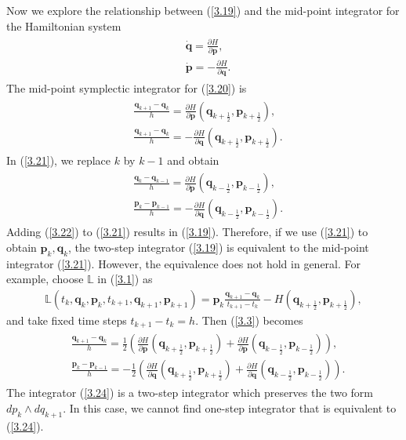 \documentclass[a4paper,a4paper]{article}
\def\q{\boldsymbol{q}}
\def\p{\boldsymbol{p}}
\begin{document}
Now we explore the relationship between (\ref{3.19}) and the mid-point integrator
for the Hamiltonian system
\begin{align}
\begin{split}
     &\dot{\q}=\frac{\partial H}{\partial \p},\\
     &\dot{\p}=-\frac{\partial H}{\partial \q}. \label{3.20}
\end{split}
\end{align}
The mid-point symplectic integrator for (\ref{3.20}) is
\begin{align}
\begin{split}
   &\frac{\q_{k+1}-\q_{k}}{h}=\frac{\partial H}{\partial \p}
        (\q_{k+\frac{1}{2}}, \p_{k+\frac{1}{2}}),\\
  &\frac{\q_{k+1}-\q_{k}}{h}=-\frac{\partial H}{\partial \q}
        (\q_{k+\frac{1}{2}}, \p_{k+\frac{1}{2}}).
\end{split}\label{3.21}
\end{align}
In (\ref{3.21}), we replace $k$ by $k-1$ and obtain
\begin{align}
\begin{split}
   &\frac{\q_{k}-\q_{k-1}}{h}=\frac{\partial H}{\partial \p}
        (\q_{k-\frac{1}{2}}, \p_{k-\frac{1}{2}}),\\
  &\frac{\p_{k}-\p_{k-1}}{h}=-\frac{\partial H}{\partial \q}
        (\q_{k-\frac{1}{2}}, \p_{k-\frac{1}{2}}).
\end{split}\label{3.22}
\end{align}
Adding (\ref{3.22}) to (\ref{3.21}) results in (\ref{3.19}). Therefore, if we use
 (\ref{3.21}) to obtain $\p_{k}, \q_{k}$, the two-step integrator (\ref{3.19}) is equivalent
to the mid-point integrator (\ref{3.21}). However, the equivalence does not
hold in general. For example,  choose $\mathbb{L}$ in (\ref{3.1}) as
\begin{align}
  \mathbb{L}(t_{k}, \q_{k}, \p_{k}, t_{k+1}, \q_{k+1}, \p_{k+1})
     =\p_{k}\frac{\q_{k+1}-\q_{k}}{t_{k+1}-t_{k}}-H(\q_{k+\frac{1}{2}},
     \p_{k+\frac{1}{2}}), \label{3.23}
\end{align}
 and take fixed time steps $t_{k+1}-t_{k}=h$. Then (\ref{3.3}) becomes
\begin{align}
\begin{split}
   &\frac{\q_{k+1}-\q_{k}}{h}=\frac{1}{2}\left(\frac{\partial H}{\partial \p}
     (\q_{k+\frac{1}{2}},
    \p_{k+\frac{1}{2}})+\frac{\partial H}{\partial \p}(\q_{k-\frac{1}{2}},
    \p_{k-\frac{1}{2}})\right),\\
  &\frac{\p_{k}-\p_{k-1}}{h}=-\frac{1}{2}\left(\frac{\partial H}{\partial \q}
        (\q_{k+\frac{1}{2}},
    \p_{k+\frac{1}{2}})+\frac{\partial H}{\partial \q}(\q_{k-\frac{1}{2}},
    \p_{k-\frac{1}{2}})\right).
\end{split}\label{3.24}
\end{align}
The integrator (\ref{3.24}) is a two-step integrator which
preserves the two form $dp_{k}\wedge dq_{k+1}$. In this case, we
cannot find one-step integrator that is equivalent to
(\ref{3.24}).
\end{document}
